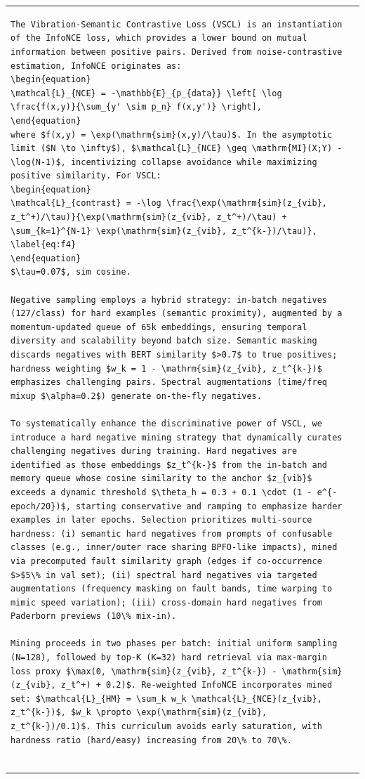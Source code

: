 \begin{table}[htbp]
\begin{tabular}{@{}ll@{}}
\begin{verbatim}
The Vibration-Semantic Contrastive Loss (VSCL) is an instantiation of the InfoNCE loss, which provides a lower bound on mutual information between positive pairs. Derived from noise-contrastive estimation, InfoNCE originates as:
\begin{equation}
\mathcal{L}_{NCE} = -\mathbb{E}_{p_{data}} \left[ \log \frac{f(x,y)}{\sum_{y' \sim p_n} f(x,y')} \right],
\end{equation}
where $f(x,y) = \exp(\mathrm{sim}(x,y)/\tau)$. In the asymptotic limit ($N \to \infty$), $\mathcal{L}_{NCE} \geq \mathrm{MI}(X;Y) - \log(N-1)$, incentivizing collapse avoidance while maximizing positive similarity. For VSCL:
\begin{equation}
\mathcal{L}_{contrast} = -\log \frac{\exp(\mathrm{sim}(z_{vib}, z_t^+)/\tau)}{\exp(\mathrm{sim}(z_{vib}, z_t^+)/\tau) + \sum_{k=1}^{N-1} \exp(\mathrm{sim}(z_{vib}, z_t^{k-})/\tau)},
\label{eq:f4}
\end{equation}
$\tau=0.07$, sim cosine. 

Negative sampling employs a hybrid strategy: in-batch negatives (127/class) for hard examples (semantic proximity), augmented by a momentum-updated queue of 65k embeddings, ensuring temporal diversity and scalability beyond batch size. Semantic masking discards negatives with BERT similarity $>0.7$ to true positives; hardness weighting $w_k = 1 - \mathrm{sim}(z_{vib}, z_t^{k-})$ emphasizes challenging pairs. Spectral augmentations (time/freq mixup $\alpha=0.2$) generate on-the-fly negatives.

To systematically enhance the discriminative power of VSCL, we introduce a hard negative mining strategy that dynamically curates challenging negatives during training. Hard negatives are identified as those embeddings $z_t^{k-}$ from the in-batch and memory queue whose cosine similarity to the anchor $z_{vib}$ exceeds a dynamic threshold $\theta_h = 0.3 + 0.1 \cdot (1 - e^{-epoch/20})$, starting conservative and ramping to emphasize harder examples in later epochs. Selection prioritizes multi-source hardness: (i) semantic hard negatives from prompts of confusable classes (e.g., inner/outer race sharing BPFO-like impacts), mined via precomputed fault similarity graph (edges if co-occurrence $>$5\% in val set); (ii) spectral hard negatives via targeted augmentations (frequency masking on fault bands, time warping to mimic speed variation); (iii) cross-domain hard negatives from Paderborn previews (10\% mix-in).

Mining proceeds in two phases per batch: initial uniform sampling (N=128), followed by top-K (K=32) hard retrieval via max-margin loss proxy $\max(0, \mathrm{sim}(z_{vib}, z_t^{k-}) - \mathrm{sim}(z_{vib}, z_t^+) + 0.2)$. Re-weighted InfoNCE incorporates mined set: $\mathcal{L}_{HM} = \sum_k w_k \mathcal{L}_{NCE}(z_{vib}, z_t^{k-})$, $w_k \propto \exp(\mathrm{sim}(z_{vib}, z_t^{k-})/0.1)$. This curriculum avoids early saturation, with hardness ratio (hard/easy) increasing from 20\% to 70\%.


\end{verbatim}
\end{tabular}
\end{table}
